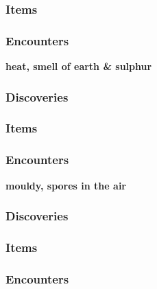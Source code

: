 \subsubsection{Items}
\begin{itemize}
\end{itemize}
\subsubsection{Encounters}
\begin{itemize}
\end{itemize}


\textbf{heat, smell of earth \& sulphur}
\begin{DndReadAloud}
\end{DndReadAloud}
\subsubsection{Discoveries}
\begin{itemize}
\end{itemize}
\subsubsection{Items}
\begin{itemize}
\end{itemize}
\subsubsection{Encounters}
\begin{itemize}
\end{itemize}


\textbf{mouldy, spores in the air}
\begin{DndReadAloud}
\end{DndReadAloud}
\subsubsection{Discoveries}
\begin{itemize}
\end{itemize}
\subsubsection{Items}
\begin{itemize}
\end{itemize}
\subsubsection{Encounters}
\begin{itemize}
\end{itemize}


